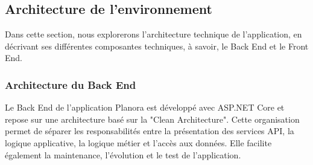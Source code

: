 \subsection{Architecture de l'environnement}
Dans cette section, nous explorerons l'architecture technique de l'application, en décrivant ses différentes composantes techniques, à savoir, le Back End et le Front End.
\subsubsection{Architecture du Back End}
Le Back End de l'application Planora est développé avec ASP.NET Core et repose sur une architecture basé sur la "Clean Architecture". Cette organisation permet de séparer les responsabilités entre la présentation des services API, la logique applicative, la logique métier et l'accès aux données. Elle facilite également la maintenance, l'évolution et le test de l'application.

